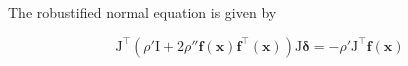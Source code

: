 The robustified normal equation is given by

\begin{equation}
    \mathrm{J}^\top \left(
        \rho'\mathrm{I} + 2\rho''
        \mathbf{f}(\bm{x}) \mathbf{f}^\top(\bm{x})
    \right) \mathrm{J} \bm{\delta}
    =
    -\rho' \mathrm{J}^\top \mathbf{f}(\bm{x})
\end{equation}
